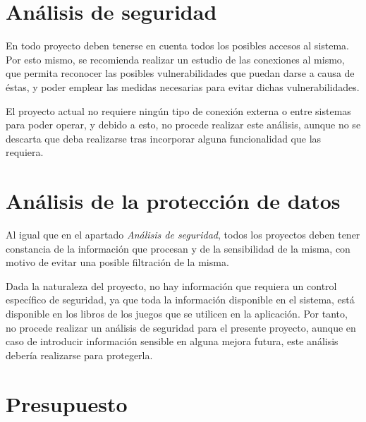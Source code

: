\section{Análisis de seguridad}
En todo proyecto deben tenerse en cuenta todos los posibles accesos al sistema. Por 
esto mismo, se recomienda realizar un estudio de las conexiones al mismo, que permita reconocer las 
posibles vulnerabilidades que puedan darse a causa de éstas, y poder emplear las medidas necesarias 
para evitar dichas vulnerabilidades. \medskip

El proyecto actual no requiere ningún tipo de conexión externa o entre sistemas para poder operar, y 
debido a esto, no procede realizar este análisis, aunque no se descarta que deba realizarse tras 
incorporar alguna funcionalidad que las requiera.

\section{Análisis de la protección de datos}
Al igual que en el apartado \textit{Análisis de seguridad}, todos los proyectos deben tener constancia 
de la información que procesan y de la sensibilidad de la misma, con motivo de evitar una posible filtración 
de la misma. \medskip

Dada la naturaleza del proyecto, no hay información que requiera un control específico 
de seguridad, ya que toda la información disponible en el sistema, está disponible en los libros de los
juegos que se utilicen en la aplicación. Por tanto, no procede realizar un análisis de seguridad para 
el presente proyecto, aunque en caso de introducir información sensible en alguna mejora futura, este 
análisis debería realizarse para protegerla.

\section{Presupuesto}




